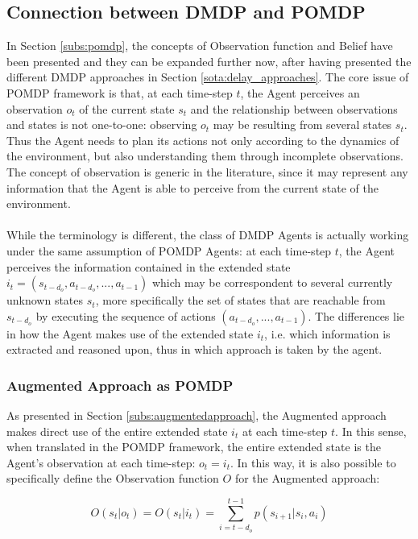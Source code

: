         \subsection{Connection between DMDP and POMDP}
            In Section \ref{subs:pomdp}, the concepts of Observation function and Belief have been presented and they can be expanded further now, after having presented the different DMDP approaches in Section \ref{sota:delay_approaches}. The core issue of POMDP framework is that, at each time-step $t$, the Agent perceives an observation $o_t$ of the current state $s_t$ and the relationship between observations and states is not one-to-one: observing $o_t$ may be resulting from several states $s_t$. Thus the Agent needs to plan its actions not only according to the dynamics of the environment, but also understanding them through incomplete observations. The concept of observation is generic in the literature, since it may represent any information that the Agent is able to perceive from the current state of the environment.
            \\\\
            While the terminology is different, the class of DMDP Agents is actually working under the same assumption of POMDP Agents: at each time-step $t$, the Agent perceives the information contained in the extended state $i_t = (s_{t-d_o}, a_{t-d_o}, ..., a_{t-1})$ which may be correspondent to several currently unknown states $s_t$, more specifically the set of states that are reachable from $s_{t-d_o}$ by executing the sequence of actions $(a_{t-d_o}, ..., a_{t-1})$. The differences lie in how the Agent makes use of the extended state $i_t$, i.e. which information is extracted and reasoned upon, thus in which approach is taken by the agent.
            
            \subsubsection{Augmented Approach as POMDP}
                As presented in Section \ref{subs:augmentedapproach}, the Augmented approach makes direct use of the entire extended state $i_t$ at each time-step $t$. In this sense, when translated in the POMDP framework, the entire extended state is the Agent's observation at each time-step: $o_t = i_t$. In this way, it is also possible to specifically define the Observation function $O$ for the Augmented approach:
                
                \[ O(s_t|o_t) = O(s_t|i_t) = \sum_{i = t - d_o}^{t-1} p(s_{i+1}|s_{i}, a_{i}) \]
                
